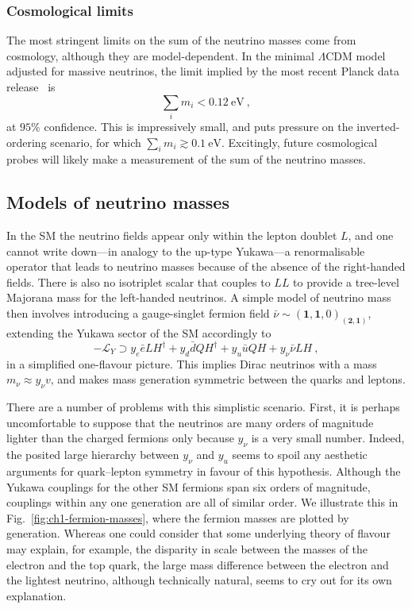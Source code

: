 \subsubsection{Cosmological limits}

The most stringent limits on the sum of the neutrino masses come from cosmology,
although they are model-dependent. In the minimal $\Lambda$CDM model adjusted
for massive neutrinos, the limit implied by the most recent Planck data
release~\cite{Aghanim:2018eyx} is
\begin{equation}
  \sum_{i} m_{i} < \SI{0.12}{\eV} \ ,
\end{equation}
at $95\%$ confidence. This is impressively small, and puts pressure on the
inverted-ordering scenario, for which $\sum_{i} m_{i} \gtrsim \SI{0.1}{\eV}$.
Excitingly, future cosmological probes will likely make a measurement of the sum
of the neutrino masses.

\subsection{Models of neutrino masses}
\label{sec:ch1-models-of-mv}

In the SM the neutrino fields appear only within the lepton doublet $L$, and one
cannot write down---in analogy to the up-type Yukawa---a renormalisable operator
that leads to neutrino masses because of the absence of the right-handed fields.
There is also no isotriplet scalar that couples to $LL$ to provide a tree-level
Majorana mass for the left-handed neutrinos. A simple model of neutrino mass
then involves introducing a gauge-singlet fermion field
$\bar{\nu} \sim (\mathbf{1}, \mathbf{1}, 0)_{(\mathbf{2}, \mathbf{1})}$,
extending the Yukawa sector of the SM accordingly to
\begin{equation}
  -\mathscr{L}_{Y} \supset y_{e}\bar{e}LH^{\dagger} + y_{d}\bar{d}QH^{\dagger} + y_{u} \bar{u}QH + y_{\nu}\bar{\nu}LH \ ,
\end{equation}
in a simplified one-flavour picture. This implies Dirac neutrinos with a mass
$m_{\nu} \approx y_{\nu} v$, and makes mass generation symmetric between the
quarks and leptons.

There are a number of problems with this simplistic scenario. First, it is
perhaps uncomfortable to suppose that the neutrinos are many orders of magnitude
lighter than the charged fermions only because $y_{\nu}$ is a very small number.
Indeed, the posited large hierarchy between $y_{\nu}$ and $y_{u}$ seems to spoil
any aesthetic arguments for quark--lepton symmetry in favour of this hypothesis.
Although the Yukawa couplings for the other SM fermions span six orders of
magnitude, couplings within any one generation are all of similar order. We
illustrate this in Fig.~\ref{fig:ch1-fermion-masses}, where the fermion masses are
plotted by generation. Whereas one could consider that some underlying theory of
flavour may explain, for example, the disparity in scale between the masses of
the electron and the top quark, the large mass difference between the electron
and the lightest neutrino, although technically natural, seems to cry out for
its own explanation.

